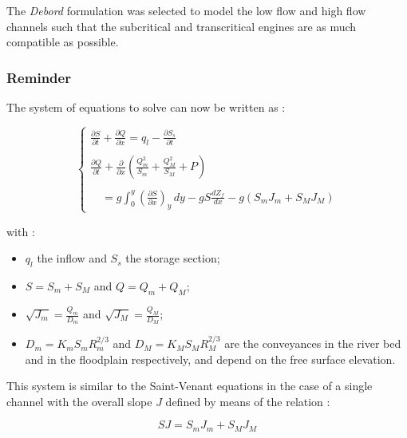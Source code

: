 The \emph{Debord} formulation was selected to model the low flow and high flow channels such that the subcritical and transcritical engines are as much compatible as possible.

\subsubsection{Reminder}

The system of equations to solve can now be written as :

\begin{equation}
 \label{SyEQ}
 \left \lbrace
  \begin{array}{l}
    \frac{\partial S}{\partial t} + \frac{\partial Q}{\partial x} = q_l - \frac{\partial S_s}{\partial t} \\
    \\
    \frac{\partial Q}{\partial t} + \frac{\partial}{\partial x} \left ( \frac{Q_{m}^2}{S_m} + \frac{Q_{M}^2}{S_M} + P \right ) \\
    \\
    \quad = g \int_{0}^y \left ( \frac{\partial S}{\partial x}\right )_y \, dy - g S \frac{d Z_f}{d x} - g (S_m J_m + S_M J_M)
  \end{array}
 \right.
\end{equation}

with :

\begin{itemize}
 \item $q_l$ the inflow and $S_s$ the storage section;
 \item $S = S_m + S_M$ and $Q = Q_m + Q_M$;
 \item $\sqrt{J_m} = \frac{Q_m}{D_m}$ and $\sqrt{J_M} = \frac{Q_M}{D_M}$;
 \item $D_m = K_m S_m R_{m}^{2/3}$ and $D_M = K_M S_M R_{M}^{2/3}$ are the conveyances in the river bed and in the floodplain respectively, and depend on the free surface elevation.
\end{itemize}

This system is similar to the Saint-Venant equations in the case of a single channel with the overall slope $J$ defined by means of the relation :

\begin{equation}
 S J = S_m J_m + S_M J_M
\end{equation}

